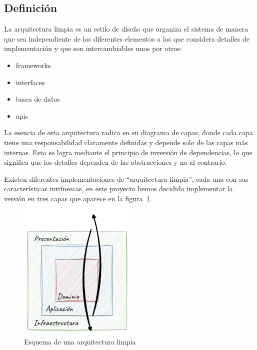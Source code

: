 \subsection{Definición}
La arquitectura limpia es un estilo de diseño que organiza el sistema de manera que sea independiente de los diferentes
elementos a los que considera detalles de implementación y que son intercambiables unos por otros:

\begin{itemize}
    \item frameworks
    \item interfaces
    \item bases de datos
    \item apis
\end{itemize}

La esencia de esta arquitectura radica en su diagrama de capas, donde cada capa tiene una responsabilidad claramente
definidas y depende solo de las capas más internas.
Esto se logra mediante el principio de inversión de dependencias, lo que significa que los detalles dependen de las
abstracciones y no al contrario.

Existen diferentes implementaciones de ``arquitectura limpia'', cada una con sus características intrínsecas, en este
proyecto hemos decidido implementar la versión en tres capas que aparece en la figura~\ref{fig:chapter_2.clean_architecture}.

\begin{figure}
    \begin{center}
        \includegraphics[width=0.5\textwidth]{chapter/2/images/chapter_2.clean_architecture}
        \caption{Esquema de una arquitectura limpia}
        \label{fig:chapter_2.clean_architecture}
    \end{center}
\end{figure}

